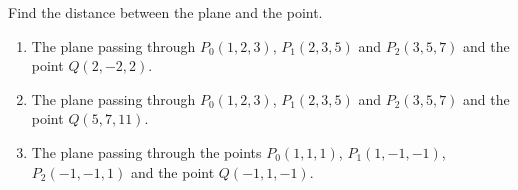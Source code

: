 Find the distance between the plane and the point.

\begin{enumerate}
\item The plane passing through $P_0(1,2,3) $, $P_1(2,3,5)$ and $P_2(3,5,7)$ and the point $Q(2,-2,2)$.
\item The plane passing through $P_0(1,2,3) $, $P_1(2,3,5)$ and $P_2(3,5,7)$ and the point $Q(5,7,11)$.
\item The plane passing through the points $P_0(1,1,1)$, $P_1(1,-1,-1)$, $P_2(-1,-1,1)$ and the point $Q(-1,1,-1)$.
\end{enumerate}

\begin{comment}
Calculator code to solve above problem:

p0:=(1,2,3); 
p1:=(2,3,5);
p2:=(3,5,7);
q:=(2,-2,2);
u1:=p1-p0;
u2:=p2-p0;
u:=q-p0;
n:=u1\times u2;
((u n^t)_1)_1 /\sqrt{}(((n n^t)_1)_1) 
\end{comment}